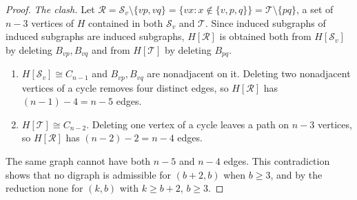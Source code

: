 \documentclass[11pt,a4paper]{article}
\theoremstyle{plain}
\theoremstyle{definition}
\theoremstyle{remark}
\newcommand{\cS}{\mathcal S}
\newcommand{\cT}{\mathcal T}
\newcommand{\cR}{\mathcal R}
\begin{document}
\begin{proof}
\emph{The clash.} Let $\cR=\cS_v\setminus\{vp,vq\}=\{vx:x\notin\{v,p,q\}\}=\cT\setminus\{pq\}$, a set of $n-3$ vertices of $H$ contained in both $\cS_v$ and $\cT$. Since induced subgraphs of induced subgraphs are induced subgraphs, $H[\cR]$ is obtained both from $H[\cS_v]$ by deleting $B_{vp},B_{vq}$ and from $H[\cT]$ by deleting $B_{pq}$.
\begin{enumerate}[nosep]
\item $H[\cS_v]\cong C_{n-1}$ and $B_{vp},B_{vq}$ are nonadjacent on it. Deleting two nonadjacent vertices of a cycle removes four distinct edges, so $H[\cR]$ has $(n-1)-4=n-5$ edges.
\item $H[\cT]\cong C_{n-2}$. Deleting one vertex of a cycle leaves a path on $n-3$ vertices, so $H[\cR]$ has $(n-2)-2=n-4$ edges.
\end{enumerate}
The same graph cannot have both $n-5$ and $n-4$ edges. This contradiction shows that no digraph is admissible for $(b+2,b)$ when $b\ge3$, and by the reduction none for $(k,b)$ with $k\ge b+2$, $b\ge3$.
\end{proof}
\end{document}
